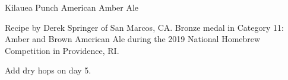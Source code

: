 \begin{recipe}{Kilauea Punch American Amber Ale} %

\begin{aboutblock}
Recipe by Derek Springer of San Marcos, CA. Bronze medal in Category 11:
Amber and Brown American Ale during the 2019 National Homebrew Competition
in Providence, RI. \sourceaha
\end{aboutblock}


\begin{methodandtiming}
 
\begin{mashsteps}
\end{mashsteps}

\begin{fermentationsteps}
\end{fermentationsteps}

\begin{directions}
Add dry hops on day 5.
\end{directions}

\end{methodandtiming}

\recipebreak

\begin{ingredientsblock}

\begin{malts}
\end{malts}

\begin{hops}
\end{hops}


\end{ingredientsblock}

\end{recipe}


